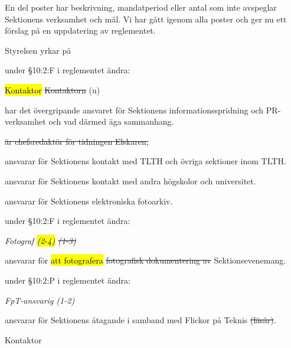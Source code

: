 \documentclass[../_main/handlingar.tex]{subfiles}
\begin{document}
En del poster har beskrivning, mandatperiod eller antal som inte avspeglar Sektionens verksamhet och mål. Vi har gått igenom alla poster och ger nu ett förslag på en uppdatering av reglementet.

Styrelsen yrkar på
\begin{attsatser}
    \att under \S10:2:F i reglementet ändra:\par
        \begin{itshape}
        \hl{Kontaktor} \sout{Kontaktorn} (u)
        \begin{itemizedash}
            \item har det övergripande ansvaret för Sektionens informationsspridning och PR-verksamhet
            och vad därmed äga sammanhang.
            \item \sout{är chefsredaktör för tidningen Elskaren,}
            \item ansvarar för Sektionens kontakt med TLTH och övriga sektioner inom TLTH.
            \item ansvarar för Sektionens kontakt med andra högskolor och universitet.
            \item ansvarar för Sektionens elektroniska fotoarkiv.
        \end{itemizedash}
        \end{itshape}

    \att under \S10:2:F i reglementet ändra:\par
    {\it
    Fotograf \hl{(2-4)} \sout{(1-3)}
    \begin{itemizedash}
        \item ansvarar för \hl{att fotografera} \sout{fotografisk dokumentering av} Sektionsevenemang.
    \end{itemizedash}
    }

    \att under \S10:2:P i reglementet ändra:\par
    {\it
    FpT-ansvarig (1-2)
    \begin{itemizedash}
        \item ansvarar för Sektionens åtagande i samband med Flickor på Teknis \sout{(läsår)}.
    \end{itemizedash}
    }
\end{attsatser}

\begin{signatures}{1}
    \ist
    \signature{Erik Månsson}{Kontaktor}
\end{signatures}
\end{document}
